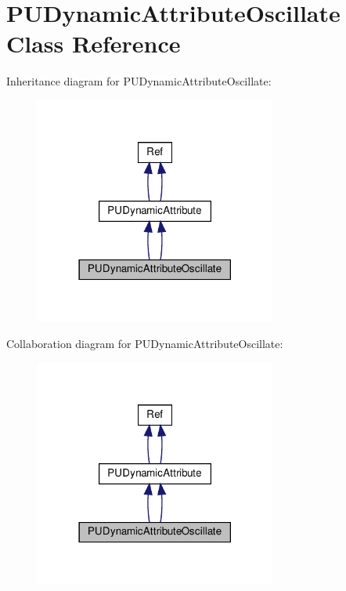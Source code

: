 \hypertarget{classPUDynamicAttributeOscillate}{}\section{P\+U\+Dynamic\+Attribute\+Oscillate Class Reference}
\label{classPUDynamicAttributeOscillate}


Inheritance diagram for P\+U\+Dynamic\+Attribute\+Oscillate\+:
\nopagebreak
\begin{figure}[H]
\begin{center}
\leavevmode
\includegraphics[width=225pt]{classPUDynamicAttributeOscillate__inherit__graph}
\end{center}
\end{figure}


Collaboration diagram for P\+U\+Dynamic\+Attribute\+Oscillate\+:
\nopagebreak
\begin{figure}[H]
\begin{center}
\leavevmode
\includegraphics[width=225pt]{classPUDynamicAttributeOscillate__coll__graph}
\end{center}
\end{figure}

